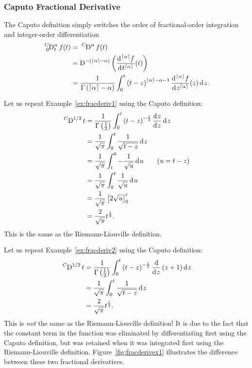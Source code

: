     \subsubsection{Caputo Fractional Derivative}
    The Caputo definition simply switches the order of fractional-order integration and integer-order differentiation
    \begin{equation}
      \begin{aligned}
	\tensor*[^{C}_0]{\D}{^\alpha_t}  f(t) &= \tensor*[^{C}]{\D}{^\alpha} f(t) \\
	&= \tensor*[]{\D}{^{-\left( \lc \alpha \rc - \alpha \right)}} \left( \frac{\d^{\lc \alpha \rc} f}{\d t^{\lc \alpha \rc}}(t) \right) \\ 
	&= 
	\frac{1}{\Gamma\left(\lc \alpha \rc - \alpha \right)} \int_0^t \left( t - z \right)^{\lc \alpha \rc - \alpha - 1}  \frac{\d^{\lc \alpha \rc}f}{\d z^{\lc \alpha \rc}} (z) \d z. 
      \end{aligned}
      \label{eq:caputodef}
    \end{equation}

    \begin{example}
      Let us repeat Example~\ref{ex:fracderiv1} using the Caputo definition:
      \begin{align*}
	\tensor*[^C]{\D}{^{1/2}} t &= \frac{1}{\Gamma \left( \frac{1}{2} \right) } \int_0^t \left( t - z \right)^{-\frac{1}{2}}
	\frac{\d z}{\d z} \d z \\
	&= \frac{1}{\sqrt{\pi}} \int_0^t \frac{1}{\sqrt{t - z}} \d z \\
	&= \frac{1}{\sqrt{\pi}} \int_t^0 -\frac{1}{\sqrt{u}} \d u \qquad (u = t - z) \\
	&= \frac{1}{\sqrt{\pi}} \int_0^t \frac{1}{\sqrt{u}} \d u \\
	&= \frac{1}{\sqrt{\pi}} \left[ 2 \sqrt{u} \right]_0^t \\
	&= \frac{2}{\sqrt{\pi}} t^\frac{1}{2}.
      \end{align*}
      This is the same as the Riemann-Liouville definition. 
      \label{ex:caputo1}
    \end{example}

    \begin{example}
      Let us repeat Example~\ref{ex:fracderiv2} using the Caputo definition:
      \begin{align*}
	\tensor*[^C]{\D}{^{1/2}} t &= \frac{1}{\Gamma \left( \frac{1}{2} \right) } \int_0^t \left( t - z \right)^{-\frac{1}{2}}
	\frac{\d }{\d z} \left( z + 1 \right) \d z \\
	&= \frac{1}{\sqrt{\pi}} \int_0^t \frac{1}{\sqrt{t - z}} \d z \\
	&= \frac{2}{\sqrt{\pi}} t^\frac{1}{2}.
      \end{align*}
      This is \emph{not} the same as the Riemann-Liouville definition! It is due to the fact that the constant term in the
      function was eliminated by differentiating first using the Caputo definition, but was retained when it was integrated
      first using the Riemann-Liouville definition. Figure~\ref{fig:fracderivex1} illustrates the difference between these two fractional derivatives. 
      \label{ex:fracderivex1} 
    \end{example}


